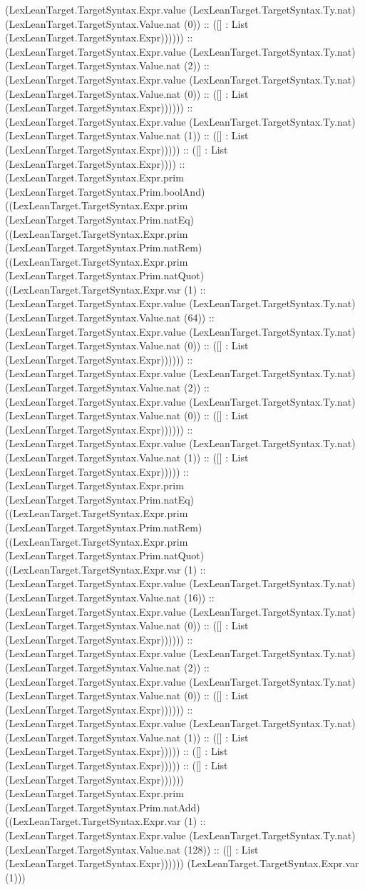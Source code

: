 \documentclass[11pt]{article}
\begin{document}
(LexLeanTarget.TargetSyntax.Expr.value (LexLeanTarget.TargetSyntax.Ty.nat) (LexLeanTarget.TargetSyntax.Value.nat (0)) :: ([] : List (LexLeanTarget.TargetSyntax.Expr)))))) :: (LexLeanTarget.TargetSyntax.Expr.value (LexLeanTarget.TargetSyntax.Ty.nat) (LexLeanTarget.TargetSyntax.Value.nat (2)) :: (LexLeanTarget.TargetSyntax.Expr.value (LexLeanTarget.TargetSyntax.Ty.nat) (LexLeanTarget.TargetSyntax.Value.nat (0)) :: ([] : List (LexLeanTarget.TargetSyntax.Expr)))))) :: (LexLeanTarget.TargetSyntax.Expr.value (LexLeanTarget.TargetSyntax.Ty.nat) (LexLeanTarget.TargetSyntax.Value.nat (1)) :: ([] : List (LexLeanTarget.TargetSyntax.Expr))))) :: ([] : List (LexLeanTarget.TargetSyntax.Expr)))) :: (LexLeanTarget.TargetSyntax.Expr.prim (LexLeanTarget.TargetSyntax.Prim.boolAnd) ((LexLeanTarget.TargetSyntax.Expr.prim (LexLeanTarget.TargetSyntax.Prim.natEq) ((LexLeanTarget.TargetSyntax.Expr.prim (LexLeanTarget.TargetSyntax.Prim.natRem) ((LexLeanTarget.TargetSyntax.Expr.prim (LexLeanTarget.TargetSyntax.Prim.natQuot) ((LexLeanTarget.TargetSyntax.Expr.var (1) :: (LexLeanTarget.TargetSyntax.Expr.value (LexLeanTarget.TargetSyntax.Ty.nat) (LexLeanTarget.TargetSyntax.Value.nat (64)) :: (LexLeanTarget.TargetSyntax.Expr.value (LexLeanTarget.TargetSyntax.Ty.nat) (LexLeanTarget.TargetSyntax.Value.nat (0)) :: ([] : List (LexLeanTarget.TargetSyntax.Expr)))))) :: (LexLeanTarget.TargetSyntax.Expr.value (LexLeanTarget.TargetSyntax.Ty.nat) (LexLeanTarget.TargetSyntax.Value.nat (2)) :: (LexLeanTarget.TargetSyntax.Expr.value (LexLeanTarget.TargetSyntax.Ty.nat) (LexLeanTarget.TargetSyntax.Value.nat (0)) :: ([] : List (LexLeanTarget.TargetSyntax.Expr)))))) :: (LexLeanTarget.TargetSyntax.Expr.value (LexLeanTarget.TargetSyntax.Ty.nat) (LexLeanTarget.TargetSyntax.Value.nat (1)) :: ([] : List (LexLeanTarget.TargetSyntax.Expr))))) :: (LexLeanTarget.TargetSyntax.Expr.prim (LexLeanTarget.TargetSyntax.Prim.natEq) ((LexLeanTarget.TargetSyntax.Expr.prim (LexLeanTarget.TargetSyntax.Prim.natRem) ((LexLeanTarget.TargetSyntax.Expr.prim (LexLeanTarget.TargetSyntax.Prim.natQuot) ((LexLeanTarget.TargetSyntax.Expr.var (1) :: (LexLeanTarget.TargetSyntax.Expr.value (LexLeanTarget.TargetSyntax.Ty.nat) (LexLeanTarget.TargetSyntax.Value.nat (16)) :: (LexLeanTarget.TargetSyntax.Expr.value (LexLeanTarget.TargetSyntax.Ty.nat) (LexLeanTarget.TargetSyntax.Value.nat (0)) :: ([] : List (LexLeanTarget.TargetSyntax.Expr)))))) :: (LexLeanTarget.TargetSyntax.Expr.value (LexLeanTarget.TargetSyntax.Ty.nat) (LexLeanTarget.TargetSyntax.Value.nat (2)) :: (LexLeanTarget.TargetSyntax.Expr.value (LexLeanTarget.TargetSyntax.Ty.nat) (LexLeanTarget.TargetSyntax.Value.nat (0)) :: ([] : List (LexLeanTarget.TargetSyntax.Expr)))))) :: (LexLeanTarget.TargetSyntax.Expr.value (LexLeanTarget.TargetSyntax.Ty.nat) (LexLeanTarget.TargetSyntax.Value.nat (1)) :: ([] : List (LexLeanTarget.TargetSyntax.Expr))))) :: ([] : List (LexLeanTarget.TargetSyntax.Expr))))) :: ([] : List (LexLeanTarget.TargetSyntax.Expr)))))) (LexLeanTarget.TargetSyntax.Expr.prim (LexLeanTarget.TargetSyntax.Prim.natAdd) ((LexLeanTarget.TargetSyntax.Expr.var (1) :: (LexLeanTarget.TargetSyntax.Expr.value (LexLeanTarget.TargetSyntax.Ty.nat) (LexLeanTarget.TargetSyntax.Value.nat (128)) :: ([] : List (LexLeanTarget.TargetSyntax.Expr)))))) (LexLeanTarget.TargetSyntax.Expr.var (1))) 
\end{document}
